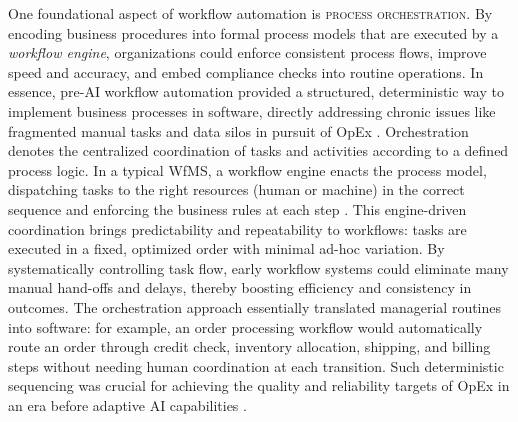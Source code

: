 One foundational aspect of workflow automation is \textsc{process orchestration}. By encoding business procedures into formal process models that are executed by a \emph{workflow engine}, organizations could enforce consistent process flows, improve speed and accuracy, and embed compliance checks into routine operations. In essence, pre-AI workflow automation provided a structured, deterministic way to implement business processes in software, directly addressing chronic issues like fragmented manual tasks and data silos in pursuit of OpEx \parencite[cf.][p. 231]{gadatschGrundkurs2012}. Orchestration denotes the centralized coordination of tasks and activities according to a defined process logic. In a typical WfMS, a workflow engine enacts the process model, dispatching tasks to the right resources (human or machine) in the correct sequence and enforcing the business rules at each step \parencite{basuResearch2002}. This engine-driven coordination brings predictability and repeatability to workflows: tasks are executed in a fixed, optimized order with minimal ad-hoc variation. By systematically controlling task flow, early workflow systems could eliminate many manual hand-offs and delays, thereby boosting efficiency and consistency in outcomes. The orchestration approach essentially translated managerial routines into software: for example, an order processing workflow would automatically route an order through credit check, inventory allocation, shipping, and billing steps without needing human coordination at each transition. Such deterministic sequencing was crucial for achieving the quality and reliability targets of OpEx in an era before adaptive AI capabilities \parencite[cf.][pp. 283-285]{stohrWorkflow2001}.

